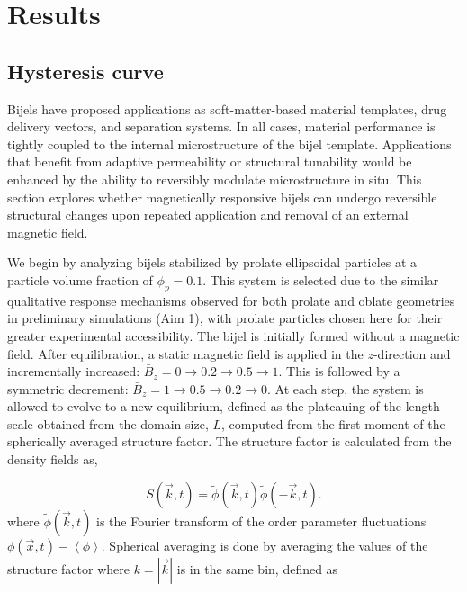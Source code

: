 \section{Results}\label{sec:results_p2}
\subsection{Hysteresis curve}
\label{section:hysteresis_curve}

Bijels have proposed applications as soft-matter-based material templates, drug delivery vectors, and separation systems. In all cases, material performance is 
tightly coupled to the internal microstructure of the bijel template. Applications that benefit from adaptive permeability or structural tunability would be 
enhanced by the ability to reversibly modulate microstructure in situ. This section explores whether magnetically responsive bijels can undergo reversible 
structural changes upon repeated application and removal of an external magnetic field.

We begin by analyzing bijels stabilized by prolate ellipsoidal particles at a particle volume fraction of \(\phi_p = 0.1\). This system is selected due to the 
similar qualitative response mechanisms observed for both prolate and oblate geometries in preliminary simulations (Aim 1), with prolate particles chosen here 
for their greater experimental accessibility. The bijel is initially formed without a magnetic field. After equilibration, a static magnetic field is applied 
in the \(z\)-direction and incrementally increased: \(\bar{B}_z = 0 \rightarrow 0.2 \rightarrow 0.5 \rightarrow 1\). This is followed by a symmetric 
decrement: \(\bar{B}_z = 1 \rightarrow 0.5 \rightarrow 0.2 \rightarrow 0\). At each step, the system is allowed to evolve to a new equilibrium, defined as
the plateauing of the length scale obtained from the domain size, \(L\), computed from the first moment of the spherically averaged structure factor.
\cite{kendon_3d_1999,kendon_inertial_2001} The structure factor is calculated from the density fields as,

%
\begin{equation}
S(\vec{k},t) = \tilde{\phi}(\vec{k},t)\tilde{\phi}(-\vec{k},t) .
\end{equation}
%
where \(\tilde{\phi}(\vec{k},t)\) is the Fourier
transform of the order parameter fluctuations
\(\phi(\vec{x},t)-\left\langle\phi\right\rangle\). Spherical averaging is 
done by averaging the values of the structure factor where $k = |\vec{k}|$ is in
the same bin, defined as


